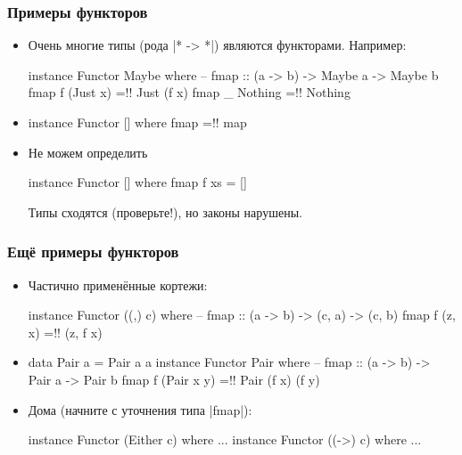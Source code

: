 \documentclass[11pt]{beamer}
\begin{document}
\begin{frame}[fragile]
  \frametitle{Примеры функторов}
  \begin{itemize}
    \item Очень многие типы (рода \haskinline|* -> *|) являются функторами. Например:
          \begin{haskell}
            instance Functor Maybe where 
              -- fmap :: (a -> b) -> Maybe a -> Maybe b
              fmap f (Just x) =!\pause! Just (f x)
              fmap _ Nothing  =!\pause! Nothing
          \end{haskell}
          \pause
    \item
          \begin{haskell}
            instance Functor [] where 
              fmap =!\pause! map
          \end{haskell}
    \item Не можем определить
          \begin{haskell}
            instance Functor [] where 
              fmap f xs = []
          \end{haskell}
          \pause
          Типы сходятся (проверьте!), но законы нарушены.
  \end{itemize}
\end{frame}

\begin{frame}[fragile]
  \frametitle{Ещё примеры функторов}
  \begin{itemize}
    \item Частично применённые кортежи:
          \begin{haskell}
            instance Functor ((,) c) where 
            -- fmap :: (a -> b) -> (c, a) -> (c, b)
            fmap f (z, x) =!\pause! (z, f x)
          \end{haskell}
          \pause
    \item
          \begin{haskell}
            data Pair a = Pair a a
            instance Functor Pair where 
            -- fmap :: (a -> b) -> Pair a -> Pair b
            fmap f (Pair x y) =!\pause! Pair (f x) (f y)
          \end{haskell}
          \pause
    \item Дома (начните с уточнения типа \haskinline|fmap|):
          \begin{haskell}
            instance Functor (Either c) where ...
            instance Functor ((->) c) where ...
          \end{haskell}
  \end{itemize}
\end{frame}
\end{document}
